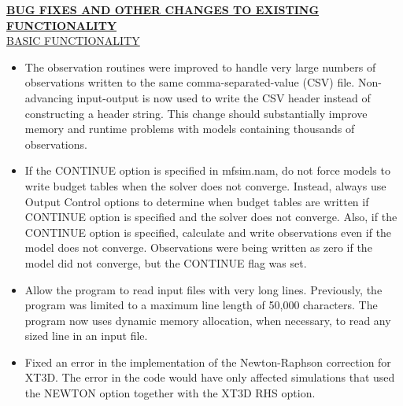 	\textbf{\underline{BUG FIXES AND OTHER CHANGES TO EXISTING FUNCTIONALITY}} \\
	\underline{BASIC FUNCTIONALITY}
	\begin{itemize}
		\item The observation routines were improved to handle very large numbers of observations written to the same comma-separated-value (CSV) file.  Non-advancing input-output is now used to write the CSV header instead of constructing a header string.   This change should substantially improve memory and runtime problems with models containing thousands of observations.
		\item If the CONTINUE option is specified in mfsim.nam, do not force models to write budget tables when the solver does not converge.  Instead, always use Output Control options to determine when budget tables are written if CONTINUE option is specified and the solver does not converge.  Also, if the CONTINUE option is specified, calculate and write observations even if the model does not converge.  Observations were being written as zero if the model did not converge, but the CONTINUE flag was set.
		\item Allow the program to read input files with very long lines.  Previously, the program was limited to a maximum line length of 50,000 characters.  The program now uses dynamic memory allocation, when necessary, to read any sized line in an input file.
		\item Fixed an error in the implementation of the Newton-Raphson correction for XT3D. The error in the code would have only affected simulations that used the NEWTON option together with the XT3D RHS option. 
	\end{itemize}

